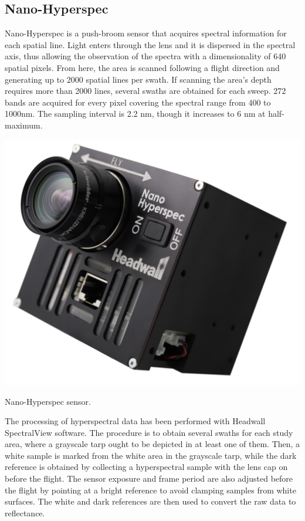 \subsection{Nano-Hyperspec}

Nano-Hyperspec is a push-broom sensor that acquires spectral information for each spatial line. Light enters through the lens and it is dispersed in the spectral axis, thus allowing the observation of the spectra with a dimensionality of 640  spatial pixels. From here, the area is scanned following a flight direction and generating up to 2000 spatial lines per swath. If scanning the area's depth requires more than 2000 lines, several swaths are obtained for each sweep. 272 bands are acquired for every pixel covering the spectral range from 400 to 1000\si{\nano\meter}. The sampling interval is 2.2 \si{\nano\meter}, though it increases to 6 \si{\nano\meter} at half-maximum.

\begin{marginfigure}[-3.0cm]
	\includegraphics{figs/materials/nano_hyperspec.png}
	\caption{Nano-Hyperspec sensor.}
	\label{fig:nano_hyperspec}
\end{marginfigure}

The processing of hyperspectral data has been performed with Headwall SpectralView\texttrademark \hspace{1mm} software. The procedure is to obtain several swaths for each study area, where a grayscale tarp ought to be depicted in at least one of them. Then, a white sample is marked from the white area in the grayscale tarp, while the dark reference is obtained by collecting a hyperspectral sample with the lens cap on before the flight. The sensor exposure and frame period are also adjusted before the flight by pointing at a bright reference to avoid clamping samples from white surfaces. The white and dark references are then used to convert the raw data to reflectance. 

